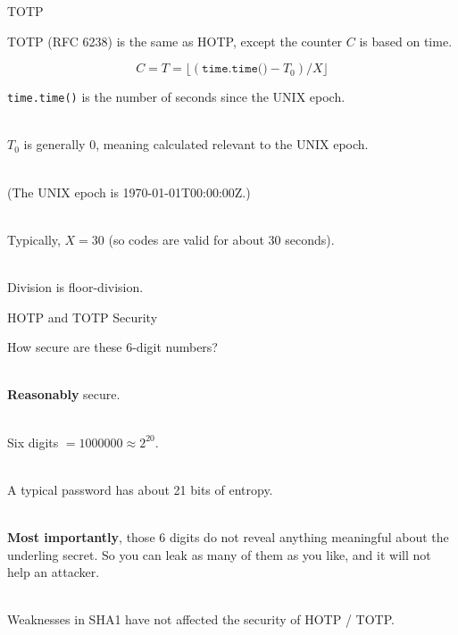 \documentclass{beamer}
\begin{document}
\begin{frame}{TOTP}

TOTP (RFC 6238) is the same as HOTP, except the counter $C$ is based on time.

$$C = T = \lfloor(\texttt{time.time()} - T_0) / X\rfloor$$

\texttt{time.time()} is the number of seconds since the UNIX epoch.

\ \\

$T_0$ is generally $0$, meaning calculated relevant to the UNIX epoch.

\ \\

(The UNIX epoch is 1970-01-01T00:00:00Z.)

\ \\

Typically, $X = 30$ (so codes are valid for about 30 seconds).

\ \\

Division is floor-division.

\end{frame}

\begin{frame}{HOTP and TOTP Security}

How secure are these 6-digit numbers?

\ \\

\textbf{Reasonably} secure.

\ \\

Six digits $ = 1000000 \approx 2^{20}$.

\ \\

A typical password has about 21 bits of entropy.

\ \\

\textbf{Most importantly}, those 6 digits do not reveal anything meaningful about the underling secret. So you can leak as many of them as you like, and it will not help an attacker.

\ \\

Weaknesses in SHA1 have not affected the security of HOTP / TOTP.

\end{frame}
\end{document}
